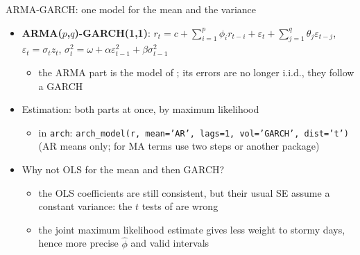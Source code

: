\begin{frame}{ARMA-GARCH: one model for the mean and the variance}
\itemsize{\small}
\begin{itemize}
    \item \textbf{ARMA($p$,$q$)-GARCH(1,1)}: $r_t = c + \sum_{i=1}^{p}\phi_i r_{t-i} + \varepsilon_t + \sum_{j=1}^{q}\theta_j\varepsilon_{t-j}$, \quad $\varepsilon_t = \sigma_t z_t$, \quad $\sigma_t^2 = \omega + \alpha\varepsilon_{t-1}^2 + \beta\sigma_{t-1}^2$
    \begin{itemize}
        \item the ARMA part is the model of ; its errors are no longer i.i.d., they follow a GARCH
    \end{itemize}
    \item Estimation: both parts at once, by maximum likelihood
    \begin{itemize}
        \item in \texttt{arch}: \texttt{arch\_model(r, mean='AR', lags=1, vol='GARCH', dist='t')} (AR means only; for MA terms use two steps or another package)
    \end{itemize}
    \item Why not OLS for the mean and then GARCH?
    \begin{itemize}
        \item the OLS coefficients are still consistent, but their usual SE assume a constant variance: the $t$ tests of  are wrong
        \item the joint maximum likelihood estimate gives less weight to stormy days, hence more precise $\hat\phi$ and valid intervals
    \end{itemize}
\end{itemize}
\end{frame}

